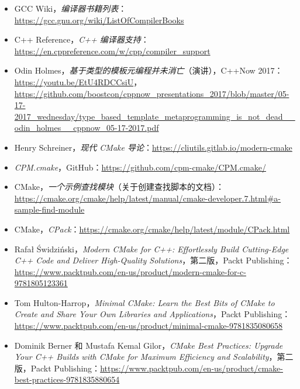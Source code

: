 \begin{itemize}
\item GCC Wiki，\emph{编译器书籍列表}：\href{https://gcc.gnu.org/wiki/ListOfCompilerBooks}{https://gcc.gnu.org/wiki/ListOfCompilerBooks}
\item C++ Reference，\emph{C++ 编译器支持}：\href{https://en.cppreference.com/w/cpp/compiler_support}{https://en.cppreference.com/w/cpp/compiler\_support}
\item Odin Holmes，\emph{基于类型的模板元编程并未消亡}（演讲），C++Now 2017：\href{https://youtu.be/EtU4RDCCsiU}{https://youtu.be/EtU4RDCCsiU}，\href{https://github.com/boostcon/cppnow_presentations_2017/blob/master/05-17-2017_wednesday/type_based_template_metaprogramming_is_not_dead__odin_holmes__cppnow_05-17-2017.pdf}{https://github.com/boostcon/cppnow\_presentations\_2017/blob/master/05-17-2017\_wednesday/type\_based\_template\_metaprogramming\_is\_not\_dead\_\_odin\_holmes\_\_cppnow\_05-17-2017.pdf}
\item Henry Schreiner，\emph{现代 CMake 导论}：\href{https://cliutils.gitlab.io/modern-cmake}{https://cliutils.gitlab.io/modern-cmake}
\item \emph{CPM.cmake}，GitHub：\href{https://github.com/cpm-cmake/CPM.cmake/}{https://github.com/cpm-cmake/CPM.cmake/}
\item CMake，\emph{一个示例查找模块}（关于创建查找脚本的文档）：\href{https://cmake.org/cmake/help/latest/manual/cmake-developer.7.html\#a-sample-find-module}{https://cmake.org/cmake/help/latest/manual/cmake-developer.7.html\#a-sample-find-module}
\item CMake，\emph{CPack}：\href{https://cmake.org/cmake/help/latest/module/CPack.html}{https://cmake.org/cmake/help/latest/module/CPack.html}
\item Rafał Świdziński，\emph{Modern CMake for C++: Effortlessly Build Cutting-Edge C++ Code and Deliver High-Quality Solutions}，第二版，Packt Publishing：\href{https://www.packtpub.com/en-us/product/modern-cmake-for-c-9781805123361}{https://www.packtpub.com/en-us/product/modern-cmake-for-c-9781805123361}
\item Tom Hulton-Harrop，\emph{Minimal CMake: Learn the Best Bits of CMake to Create and Share Your Own Libraries and Applications}，Packt Publishing：\href{https://www.packtpub.com/en-us/product/minimal-cmake-9781835080658}{https://www.packtpub.com/en-us/product/minimal-cmake-9781835080658}
\item Dominik Berner 和 Mustafa Kemal Gilor，\emph{CMake Best Practices: Upgrade Your C++ Builds with CMake for Maximum Efficiency and Scalability}，第二版，Packt Publishing：\href{https://www.packtpub.com/en-us/product/cmake-best-practices-9781835880654}{https://www.packtpub.com/en-us/product/cmake-best-practices-9781835880654}

\end{itemize}
